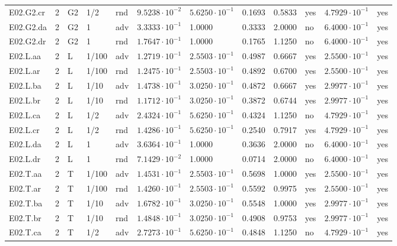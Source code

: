 {\begin{longtable}{@{}lllllllllll l@{}}
E02.G2.cr & 2 & G2 & 1/2 & rnd & $9.5238\cdot 10^{-2}$ & $5.6250\cdot 10^{-1}$ & 0.1693 & 0.5833 & yes & $4.7929\cdot 10^{-1}$ & yes \\
E02.G2.da & 2 & G2 & 1 & adv & $3.3333\cdot 10^{-1}$ & 1.0000 & 0.3333 & 2.0000 & no & $6.4000\cdot 10^{-1}$ & yes \\
E02.G2.dr & 2 & G2 & 1 & rnd & $1.7647\cdot 10^{-1}$ & 1.0000 & 0.1765 & 1.1250 & no & $6.4000\cdot 10^{-1}$ & yes \\
E02.L.aa & 2 & L & 1/100 & adv & $1.2719\cdot 10^{-1}$ & $2.5503\cdot 10^{-1}$ & 0.4987 & 0.6667 & yes & $2.5500\cdot 10^{-1}$ & yes \\
E02.L.ar & 2 & L & 1/100 & rnd & $1.2475\cdot 10^{-1}$ & $2.5503\cdot 10^{-1}$ & 0.4892 & 0.6700 & yes & $2.5500\cdot 10^{-1}$ & yes \\
E02.L.ba & 2 & L & 1/10 & adv & $1.4738\cdot 10^{-1}$ & $3.0250\cdot 10^{-1}$ & 0.4872 & 0.6667 & yes & $2.9977\cdot 10^{-1}$ & yes \\
E02.L.br & 2 & L & 1/10 & rnd & $1.1712\cdot 10^{-1}$ & $3.0250\cdot 10^{-1}$ & 0.3872 & 0.6744 & yes & $2.9977\cdot 10^{-1}$ & yes \\
E02.L.ca & 2 & L & 1/2 & adv & $2.4324\cdot 10^{-1}$ & $5.6250\cdot 10^{-1}$ & 0.4324 & 1.1250 & no & $4.7929\cdot 10^{-1}$ & yes \\
E02.L.cr & 2 & L & 1/2 & rnd & $1.4286\cdot 10^{-1}$ & $5.6250\cdot 10^{-1}$ & 0.2540 & 0.7917 & yes & $4.7929\cdot 10^{-1}$ & yes \\
E02.L.da & 2 & L & 1 & adv & $3.6364\cdot 10^{-1}$ & 1.0000 & 0.3636 & 2.0000 & no & $6.4000\cdot 10^{-1}$ & yes \\
E02.L.dr & 2 & L & 1 & rnd & $7.1429\cdot 10^{-2}$ & 1.0000 & 0.0714 & 2.0000 & no & $6.4000\cdot 10^{-1}$ & yes \\
E02.T.aa & 2 & T & 1/100 & adv & $1.4531\cdot 10^{-1}$ & $2.5503\cdot 10^{-1}$ & 0.5698 & 1.0000 & yes & $2.5500\cdot 10^{-1}$ & yes \\
E02.T.ar & 2 & T & 1/100 & rnd & $1.4260\cdot 10^{-1}$ & $2.5503\cdot 10^{-1}$ & 0.5592 & 0.9975 & yes & $2.5500\cdot 10^{-1}$ & yes \\
E02.T.ba & 2 & T & 1/10 & adv & $1.6782\cdot 10^{-1}$ & $3.0250\cdot 10^{-1}$ & 0.5548 & 1.0000 & yes & $2.9977\cdot 10^{-1}$ & yes \\
E02.T.br & 2 & T & 1/10 & rnd & $1.4848\cdot 10^{-1}$ & $3.0250\cdot 10^{-1}$ & 0.4908 & 0.9753 & yes & $2.9977\cdot 10^{-1}$ & yes \\
E02.T.ca & 2 & T & 1/2 & adv & $2.7273\cdot 10^{-1}$ & $5.6250\cdot 10^{-1}$ & 0.4848 & 1.1250 & no & $4.7929\cdot 10^{-1}$ & yes \\

\end{longtable}}
